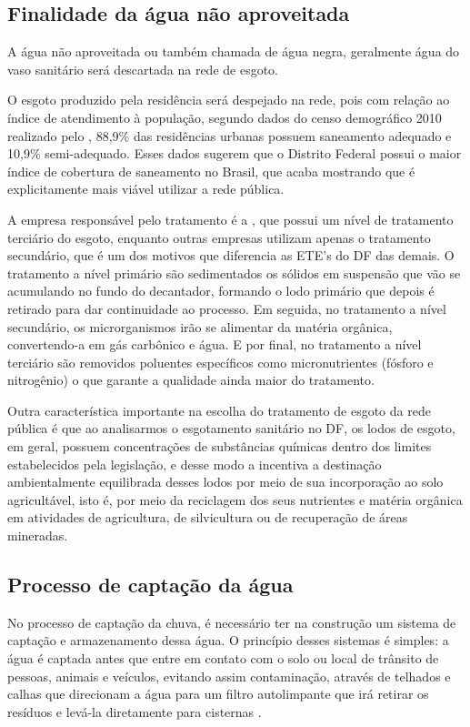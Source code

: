 \subsection{Finalidade da água não aproveitada}

	A água não aproveitada ou também chamada de água negra, geralmente água do vaso sanitário será descartada na rede de esgoto.

	O esgoto produzido pela residência será despejado na rede, pois com relação ao índice de atendimento à população, segundo dados do censo demográfico 2010 realizado pelo \cite{IBGE}, 88,9\% das residências urbanas possuem saneamento adequado e 10,9\% semi-adequado. Esses dados sugerem que o Distrito Federal possui o maior índice de cobertura de saneamento no Brasil, que acaba mostrando que é explicitamente mais viável utilizar a rede pública.

	A empresa responsável pelo tratamento é a \cite{CAESB}, que possui um nível de tratamento terciário do esgoto, enquanto outras empresas utilizam apenas o tratamento secundário, que é um dos motivos que diferencia as ETE's do DF das demais. O tratamento a nível primário são sedimentados os sólidos em suspensão que vão se acumulando no fundo do decantador, formando o lodo primário que depois é retirado para dar continuidade ao processo. Em seguida, no tratamento a nível secundário, os microrganismos irão se alimentar da matéria orgânica, convertendo-a em gás carbônico e água. E por final, no tratamento a nível terciário são removidos poluentes específicos como micronutrientes (fósforo e nitrogênio) o que garante a qualidade ainda maior do tratamento.

	Outra característica importante na escolha do tratamento de esgoto da rede pública é que ao analisarmos o esgotamento sanitário no DF, os lodos de esgoto, em geral, possuem concentrações de substâncias químicas dentro dos limites estabelecidos pela legislação, e desse modo a \cite{CAESB} incentiva a destinação ambientalmente equilibrada desses lodos por meio de sua incorporação ao solo agricultável, isto é, por meio da reciclagem dos seus nutrientes e matéria orgânica em atividades de agricultura, de silvicultura ou de recuperação de áreas mineradas.

\subsection{Processo de captação da água}

	No processo de captação da chuva, é necessário ter na construção um sistema de captação e armazenamento dessa água. O princípio desses sistemas é simples: a água é captada antes que entre em contato com o solo ou local de trânsito de pessoas, animais e veículos, evitando assim contaminação, através de telhados e calhas que direcionam a água para um filtro autolimpante que irá retirar os resíduos e levá-la diretamente para cisternas \cite{EMBRAPA}.

